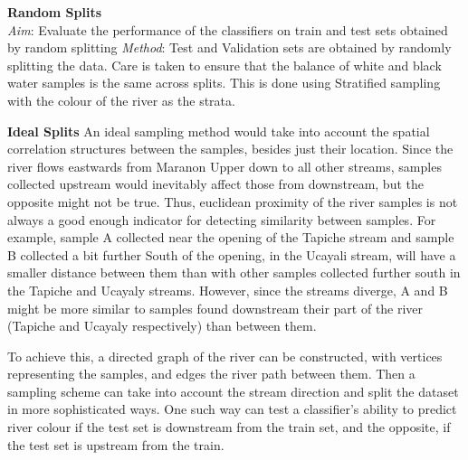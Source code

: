 \large{\bf Random Splits}\\
\textit{Aim}: Evaluate the performance of the classifiers on train and test sets obtained by random splitting
\textit{Method}: Test and Validation sets are obtained by randomly splitting the data. Care is taken to ensure that the balance of white and black water samples is the same across splits. This is done using Stratified sampling with the colour of the river as the strata.


{\bf Ideal Splits}
An ideal sampling method would take into account the spatial correlation structures between the samples, besides just their location. Since the river flows eastwards from Maranon Upper down to all other streams, samples collected upstream would inevitably affect those from downstream, but the opposite might not be true. Thus, euclidean proximity of the river samples is not always a good enough indicator for detecting similarity between samples. For example, sample A collected near the opening of the Tapiche stream and sample B collected a bit further South of the opening, in the Ucayali stream, will have a smaller distance between them than with other samples collected further south in the Tapiche and Ucayaly streams. However, since the streams diverge, A and B might be more similar to samples found downstream their part of the river (Tapiche and Ucayaly respectively) than between them. 

To achieve this, a directed graph of the river can be constructed, with vertices representing the samples, and edges the river path between them. Then a sampling scheme can take into account the stream direction and split the dataset in more sophisticated ways. One such way can test a classifier's ability to predict river colour if the test set is downstream from the train set, and the opposite, if the test set is upstream from the train. 


%
%
%
%
%



